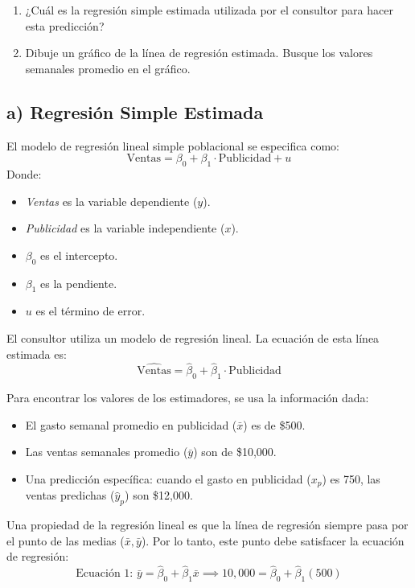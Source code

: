 \documentclass[12pt]{article}
\begin{document}
\begin{enumerate}[label=\alph*)]
    \item ¿Cuál es la regresión simple estimada utilizada por el consultor para hacer esta predicción?
    \item Dibuje un gráfico de la línea de regresión estimada. 
    Busque los valores semanales promedio en el gráfico.
\end{enumerate}

\subsection*{a) Regresión Simple Estimada}

El modelo de regresión lineal simple poblacional se especifica como:
$$
\text{Ventas} = \beta_0 + \beta_1 \cdot \text{Publicidad} + u
$$
Donde:
\begin{itemize}
    \item \textit{Ventas} es la variable dependiente ($y$).
    \item \textit{Publicidad} es la variable independiente ($x$).
    \item $\beta_0$ es el intercepto.
    \item $\beta_1$ es la pendiente.
    \item $u$ es el término de error.
\end{itemize}

El consultor utiliza un modelo de regresión lineal. La ecuación de esta línea estimada es:
$$
\hat{\text{Ventas}} = \hat{\beta}_0 + \hat{\beta}_1 \cdot \text{Publicidad}
$$

Para encontrar los valores de los estimadores, se usa la información dada:
\begin{itemize}
    \item El gasto semanal promedio en publicidad ($\bar{x}$) es de \$500.
    \item Las ventas semanales promedio ($\bar{y}$) son de \$10,000.
    \item Una predicción específica: cuando el gasto en publicidad ($x_p$) es 750, las ventas predichas ($\hat{y}_p$) son \$12,000.
\end{itemize}

Una propiedad de la regresión lineal es que la línea de regresión siempre pasa por el punto de las medias ($\bar{x}, \bar{y}$). Por lo tanto, este punto debe satisfacer la ecuación de regresión:
\begin{equation*}
\text{Ecuación 1: } \bar{y} = \hat{\beta}_0 + \hat{\beta}_1 \bar{x} \implies 10,000 = \hat{\beta}_0 + \hat{\beta}_1(500)
\end{equation*}
\end{document}
